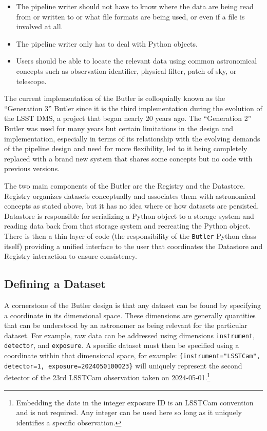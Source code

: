 \documentclass[]{spie}
\begin{document}
\begin{itemize}
\item The pipeline writer should not have to know where the data are being read from or written to or what file formats are being used, or even if a file is involved at all.
\item The pipeline writer only has to deal with Python objects.
\item Users should be able to locate the relevant data using common astronomical concepts such as observation identifier, physical filter, patch of sky, or telescope.
\end{itemize}

The current implementation of the Butler is colloquially known as the ``Generation 3'' Butler since it is the third implementation during the evolution of the LSST DMS, a project that began nearly 20 years ago.\cite{2006SPIE.6274E..0PK}
The ``Generation 2'' Butler was used for many years but certain limitations in the design and implementation, especially in terms of its relationship with the evolving demands of the pipeline design and need for more flexibility, led to it being completely replaced with a brand new system that shares some concepts but no code with previous versions.

The two main components of the Butler are the Registry and the Datastore.
Registry organizes datasets conceptually and associates them with astronomical concepts as stated above, but it has no idea where or how datasets are persisted.
Datastore is responsible for serializing a Python object to a storage system and reading data back from that storage system and recreating the Python object.
There is then a thin layer of code (the responsibility of the \texttt{Butler} Python class itself) providing a unified interface to the user that coordinates the Datastore and Registry interaction to ensure consistency.

\subsection{Defining a Dataset}

A cornerstone of the Butler design is that any dataset can be found by specifying a coordinate in its dimensional space.
These dimensions are generally quantities that can be understood by an astronomer as being relevant for the particular dataset.
For example, raw data can be addressed using dimensions \texttt{instrument}, \texttt{detector}, and \texttt{exposure}.
A specific dataset must then be specified using a coordinate within that dimensional space, for example: \texttt{\{instrument="LSSTCam", detector=1, exposure=2024050100023\}} will uniquely represent the second detector of the 23rd LSSTCam observation taken on 2024-05-01.\footnote{Embedding the date in the integer exposure ID is an LSSTCam convention and is not required. Any integer can be used here so long as it uniquely identifies a specific observation.}
\end{document}
